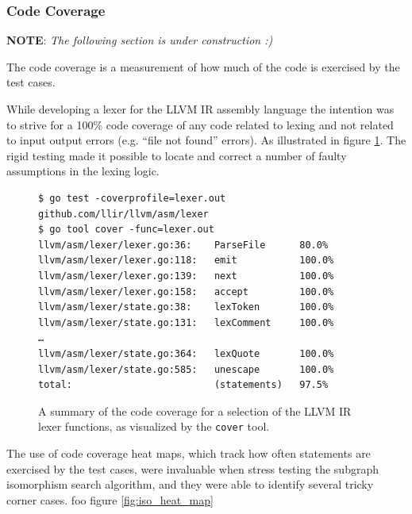 \subsubsection{Code Coverage}

\textbf{NOTE}: \textit{The following section is under construction :)}


The code coverage is a measurement of how much of the code is exercised by the test cases.


While developing a lexer for the LLVM IR assembly language the intention was to strive for a 100\% code coverage of any code related to lexing and not related to input output errors (e.g. ``file not found'' errors). As illustrated in figure \ref{fig:lexer_code_coverage}. The rigid testing made it possible to locate and correct a number of faulty assumptions in the lexing logic.

\begin{figure}[htbp]
	\begin{center}
		\begin{verbatim}
$ go test -coverprofile=lexer.out github.com/llir/llvm/asm/lexer
$ go tool cover -func=lexer.out
llvm/asm/lexer/lexer.go:36:    ParseFile      80.0%
llvm/asm/lexer/lexer.go:118:   emit           100.0%
llvm/asm/lexer/lexer.go:139:   next           100.0%
llvm/asm/lexer/lexer.go:158:   accept         100.0%
llvm/asm/lexer/state.go:38:    lexToken       100.0%
llvm/asm/lexer/state.go:131:   lexComment     100.0%
…
llvm/asm/lexer/state.go:364:   lexQuote       100.0%
llvm/asm/lexer/state.go:585:   unescape       100.0%
total:                         (statements)   97.5%
		\end{verbatim}
		\caption{A summary of the code coverage for a selection of the LLVM IR lexer functions, as visualized by the \texttt{cover} tool.}
		\label{fig:lexer_code_coverage}
	\end{center}
\end{figure}

The use of code coverage heat maps, which track how often statements are exercised by the test cases, were invaluable when stress testing the subgraph isomorphism search algorithm, and they were able to identify several tricky corner cases. foo figure \ref{fig:iso_heat_map}

